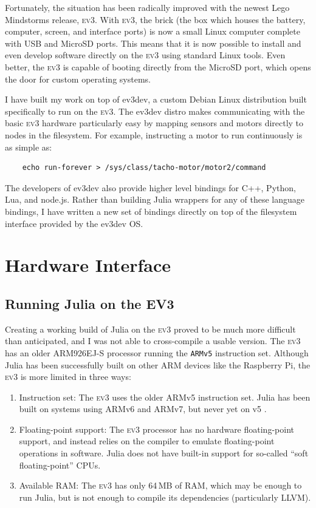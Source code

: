\documentclass[]{article}
\newcommand{\ev}{\textsc{ev3}}
\begin{document}
Fortunately, the situation has been radically improved with the newest Lego Mindstorms release, \ev{}. With \ev{}, the brick (the box which houses the battery, computer, screen, and interface ports) is now a small Linux computer complete with USB and MicroSD ports. This means that it is now possible to install and even develop software directly on the \ev{} using standard Linux tools. Even better, the \ev{} is capable of booting directly from the MicroSD port, which opens the door for custom operating systems. 

I have built my work on top of ev3dev, a custom Debian Linux distribution built specifically to run on the \ev{}. The ev3dev distro makes communicating with the basic \ev{} hardware particularly easy by mapping sensors and motors directly to nodes in the filesystem. For example, instructing a motor to run continuously is as simple as:
\begin{verbatim}
    echo run-forever > /sys/class/tacho-motor/motor2/command
\end{verbatim}
The developers of ev3dev also provide higher level bindings for C++, Python, Lua, and node.js. Rather than building Julia wrappers for any of these language bindings, I have written a new set of bindings directly on top of the filesystem interface provided by the ev3dev OS. 

\section{Hardware Interface}

\subsection{Running Julia on the EV3}

Creating a working build of Julia on the \ev{} proved to be much more difficult than anticipated, and I was not able to cross-compile a usable version. The \ev{} has an older ARM926EJ-S processor running the \texttt{ARMv5} instruction set. Although Julia has been successfully built on other ARM devices like the Raspberry Pi, the \ev{} is more limited in three ways:

\begin{enumerate}
\item Instruction set: The \ev{} uses the older ARMv5 instruction set. Julia has been built on systems using ARMv6 and ARMv7, but never yet on v5 \cite{_building_2015}.
\item Floating-point support: The \ev{} processor has no hardware floating-point support, and instead relies on the compiler to emulate floating-point operations in software. Julia does not have built-in support for so-called ``soft floating-point'' CPUs. 
\item Available RAM: The \ev{} has only 64\,MB of RAM, which may be enough to run Julia, but is not enough to compile its dependencies (particularly LLVM). 
\end{enumerate} 
\end{document}
